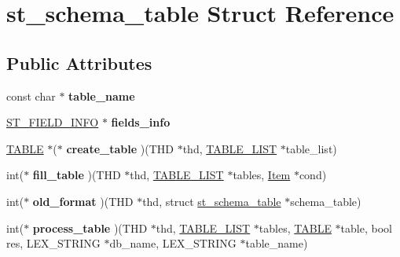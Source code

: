 \hypertarget{structst__schema__table}{}\section{st\+\_\+schema\+\_\+table Struct Reference}
\label{structst__schema__table}
\subsection*{Public Attributes}
\begin{DoxyCompactItemize}
\item 
\mbox{\label{structst__schema__table_ac98c969653327a1c2768f50a18edd9f9}} 
const char $\ast$ {\bfseries table\+\_\+name}
\item 
\mbox{\label{structst__schema__table_aa0091d4186af2cb260088eb3927fe616}} 
\mbox{\hyperlink{structst__field__info}{S\+T\+\_\+\+F\+I\+E\+L\+D\+\_\+\+I\+N\+FO}} $\ast$ {\bfseries fields\+\_\+info}
\item 
\mbox{\label{structst__schema__table_ae40eb3d9a5b88e03493950c706adecfe}} 
\mbox{\hyperlink{structTABLE}{T\+A\+B\+LE}} $\ast$($\ast$ {\bfseries create\+\_\+table} )(T\+HD $\ast$thd, \mbox{\hyperlink{structTABLE__LIST}{T\+A\+B\+L\+E\+\_\+\+L\+I\+ST}} $\ast$table\+\_\+list)
\item 
\mbox{\label{structst__schema__table_abc6d3b35d1c4cc1506a01dc37e552f3b}} 
int($\ast$ {\bfseries fill\+\_\+table} )(T\+HD $\ast$thd, \mbox{\hyperlink{structTABLE__LIST}{T\+A\+B\+L\+E\+\_\+\+L\+I\+ST}} $\ast$tables, \mbox{\hyperlink{classItem}{Item}} $\ast$cond)
\item 
\mbox{\label{structst__schema__table_a9f46d5441bb0e8e7fa35763097ce685e}} 
int($\ast$ {\bfseries old\+\_\+format} )(T\+HD $\ast$thd, struct \mbox{\hyperlink{structst__schema__table}{st\+\_\+schema\+\_\+table}} $\ast$schema\+\_\+table)
\item 
\mbox{\label{structst__schema__table_a1eb132134d840b6181427f00315dd99b}} 
int($\ast$ {\bfseries process\+\_\+table} )(T\+HD $\ast$thd, \mbox{\hyperlink{structTABLE__LIST}{T\+A\+B\+L\+E\+\_\+\+L\+I\+ST}} $\ast$tables, \mbox{\hyperlink{structTABLE}{T\+A\+B\+LE}} $\ast$table, bool res, L\+E\+X\+\_\+\+S\+T\+R\+I\+NG $\ast$db\+\_\+name, L\+E\+X\+\_\+\+S\+T\+R\+I\+NG $\ast$table\+\_\+name)

\end{DoxyCompactItemize}
